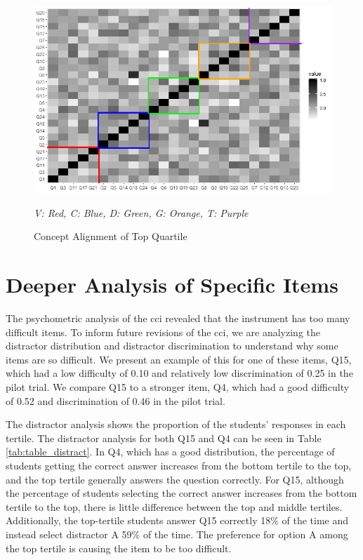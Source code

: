 \begin{figure}[!hbp]
    \centering
    \includegraphics[scale=1.4]{images/heat_map_top_quarter.png}
    \begin{minipage}{0.65\linewidth}
    \tiny
    \emph{
    V: Red,
    C: Blue,
    D: Green,
    G: Orange,
    T: Purple
    }
    \end{minipage}
    \caption{Concept Alignment of Top Quartile}
    \label{fig:alignment}
\end{figure}
\fi

\FloatBarrier
\section{Deeper Analysis of Specific Items}

The psychometric analysis of the \gls{cci} revealed that the instrument has too many difficult items. To inform future revisions of the \gls{cci}, we are analyzing the distractor distribution and distractor discrimination to understand why some items are so difficult. We present an example of this for one of these items, Q15, which had a low difficulty of 0.10 and relatively low discrimination of 0.25 in the pilot trial. We compare Q15 to a stronger item, Q4, which had a good difficulty of 0.52 and discrimination of 0.46 in the pilot trial. 

The distractor analysis shows the proportion of the students' responses in each tertile. The distractor analysis for both Q15 and Q4 can be seen in Table \ref{tab:table_distract}. In Q4, which has a good distribution, the percentage of students getting the correct answer increases from the bottom tertile to the top, and the top tertile generally answers the question correctly. For Q15, although the percentage of students selecting the correct answer increases from the bottom tertile to the top, there is little difference between the top and middle tertiles. Additionally, the top-tertile students answer Q15 correctly 18\% of the time and instead select distractor A 59\% of the time. The preference for option A among the top tertile is causing the item to be too difficult.

